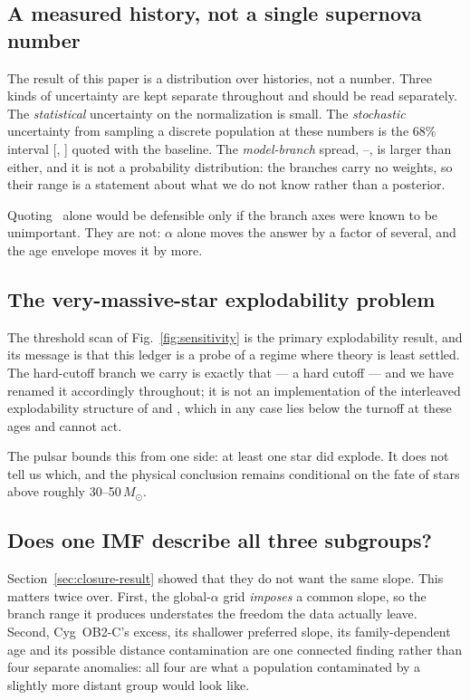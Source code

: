 \documentclass{aa}
\begin{document}
\subsection{A measured history, not a single supernova number}

The result of this paper is a distribution over histories, not a number. Three
kinds of uncertainty are kept separate throughout and should be read separately.
The \emph{statistical} uncertainty on the normalization is small. The
\emph{stochastic} uncertainty from sampling a discrete population at these
numbers is the 68\% interval [\NSNlo, \NSNhi] quoted with the baseline. The
\emph{model-branch} spread, \NSNheadlo--\NSNheadhi, is larger than either, and
it is not a probability distribution: the branches carry no weights, so their
range is a statement about what we do not know rather than a posterior.

Quoting \NSN\ alone would be defensible only if the branch axes were known to be
unimportant. They are not: $\alpha$ alone moves the answer by a factor of
several, and the age envelope moves it by more.

\subsection{The very-massive-star explodability problem}

The threshold scan of Fig.~\ref{fig:sensitivity} is the primary explodability
result, and its message is that this ledger is a probe of a regime where theory
is least settled. The hard-cutoff branch we carry is exactly that --- a hard
cutoff --- and we have renamed it accordingly throughout; it is not an
implementation of the interleaved explodability structure of
\citet{sukhbold2016} and \citet{ertl2016}, which in any case lies below the
turnoff at these ages and cannot act.

The pulsar bounds this from one side: at least one star did explode. It does not
tell us which, and the physical conclusion remains conditional on the fate of
stars above roughly 30--50\,$M_\odot$.

\subsection{Does one IMF describe all three subgroups?}

Section~\ref{sec:closure-result} showed that they do not want the same slope.
This matters twice over. First, the global-$\alpha$ grid \emph{imposes} a common
slope, so the branch range it produces understates the freedom the data actually
leave. Second, Cyg~OB2-C's excess, its shallower preferred slope, its
family-dependent age and its possible distance contamination are one connected
finding rather than four separate anomalies: all four are what a population
contaminated by a slightly more distant group would look like.
\end{document}
